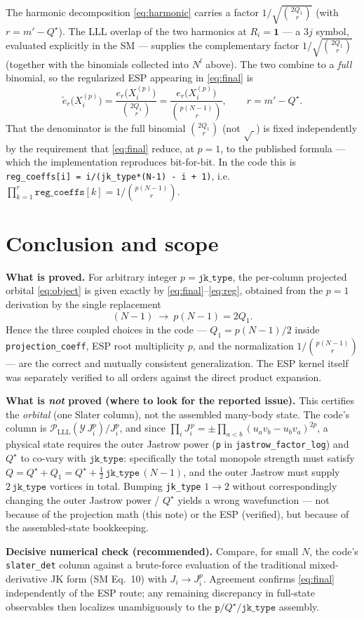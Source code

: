 \documentclass[11pt]{article}
\newcommand{\LLL}{\mathcal{P}_{\mathrm{LLL}}}
\newcommand{\Ycal}{\mathcal{Y}}
\newcommand{\Qs}{Q^{\star}}
\newcommand{\jk}{\mathtt{jk\_type}}
\newcommand{\etil}{\tilde{e}}
\begin{document}
The harmonic decomposition \eqref{eq:harmonic} carries a factor $1/\!\sqrt{\binom{2Q_1}{\,r}}$
(with $r=m'-\Qs$). The LLL overlap of the two harmonics at $R_i=\mathbf 1$ --- a $3j$ symbol,
evaluated explicitly in the SM --- supplies the complementary factor $1/\!\sqrt{\binom{2Q_1}{\,r}}$
(together with the binomials collected into $N^{l}$ above). The two combine to a \emph{full}
binomial, so the regularized ESP appearing in \eqref{eq:final} is
\begin{equation}
  \etil_{r}\!\big(X_i^{(p)}\big)=\frac{e_{r}\!\big(X_i^{(p)}\big)}{\binom{2Q_1}{\,r}}
  =\frac{e_{r}\!\big(X_i^{(p)}\big)}{\binom{p(N-1)}{\,r}},
  \qquad r=m'-\Qs .
  \label{eq:reg}
\end{equation}
That the denominator is the full binomial $\binom{2Q_1}{r}$ (not $\sqrt{\ }$) is fixed
independently by the requirement that \eqref{eq:final} reduce, at $p=1$, to the published formula
--- which the implementation reproduces bit-for-bit. In the code this is
\texttt{reg\_coeffs[i] = i/(jk\_type*(N-1) - i + 1)}, i.e.\
$\prod_{k=1}^{r}\texttt{reg\_coeffs}[k]=1/\binom{p(N-1)}{r}$.

\section{Conclusion and scope}

\textbf{What is proved.} For arbitrary integer $p=\jk$, the per-column projected orbital
\eqref{eq:object} is given exactly by \eqref{eq:final}--\eqref{eq:reg}, obtained from the $p=1$
derivation by the single replacement
\[
  (N-1)\ \longrightarrow\ p(N-1)=2Q_1 .
\]
Hence the three coupled choices in the code --- $Q_1=p(N-1)/2$ inside
\texttt{projection\_coeff}, ESP root multiplicity $p$, and the normalization
$1/\binom{p(N-1)}{r}$ --- are the correct and mutually consistent generalization. The ESP kernel
itself was separately verified to all orders against the direct product expansion.

\textbf{What is \emph{not} proved (where to look for the reported issue).} This certifies the
\emph{orbital} (one Slater column), not the assembled many-body state. The code's column is
$\LLL(\Ycal\,J_i^{p})/J_i^{p}$, and since
$\prod_i J_i^{\,p}=\pm\prod_{a<b}(u_av_b-u_bv_a)^{2p}$, a physical state requires the outer
Jastrow power (\texttt{p} in \texttt{jastrow\_factor\_log}) and $\Qs$ to co-vary with $\jk$:
specifically the total monopole strength must satisfy $Q=\Qs+Q_1=\Qs+\tfrac12\,\jk\,(N-1)$, and
the outer Jastrow must supply $2\,\jk$ vortices in total. Bumping \texttt{jk\_type} $1\to2$
without correspondingly changing the outer Jastrow power / $\Qs$ yields a wrong wavefunction ---
not because of the projection math (this note) or the ESP (verified), but because of the
assembled-state bookkeeping.

\textbf{Decisive numerical check (recommended).} Compare, for small $N$, the code's
\texttt{slater\_det} column against a brute-force evaluation of the traditional mixed-derivative
JK form (SM Eq.~10) with $J_i\to J_i^{p}$. Agreement confirms \eqref{eq:final} independently of
the ESP route; any remaining discrepancy in full-state observables then localizes unambiguously
to the $\texttt{p}/\Qs/\jk$ assembly.
\end{document}
